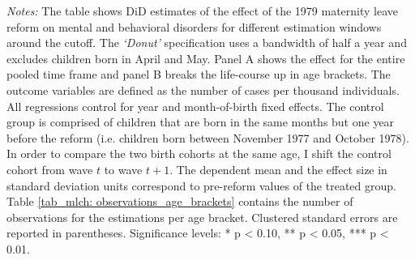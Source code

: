 \begin{landscape}
\begin{table}[H]
\begin{threeparttable}
 		\begin{tablenotes} 
 			\item \scriptsize \emph{Notes:} The table shows DiD estimates of the effect of the 1979 maternity leave reform on mental and behavioral disorders for different estimation windows around the cutoff. The \textit{`Donut'} specification uses a bandwidth of half a year and excludes children born in April and May. Panel A shows the effect for the entire pooled time frame and panel B breaks the life-course up in age brackets. The outcome variables are defined as the number of cases per thousand individuals. All regressions control for year and month-of-birth fixed effects. The control group is comprised of children that are born in the same months but one year before the reform (i.e. children born between November 1977 and October 1978). In order to compare the two birth cohorts at the same age, I shift the control cohort from wave $t$ to wave $t+1$. The dependent mean and the effect size in standard deviation units correspond to pre-reform values of the treated group. Table \ref{tab_mlch: observations_age_brackets} contains the number of observations for the estimations per age bracket. Clustered standard errors are reported in parentheses. \newline Significance levels: * p < 0.10, ** p < 0.05, *** p < 0.01. \newline 	%
 		\end{tablenotes} 
 	\end{threeparttable} 
 \end{table}
\vspace*{\fill}\clearpage 
\end{landscape}
